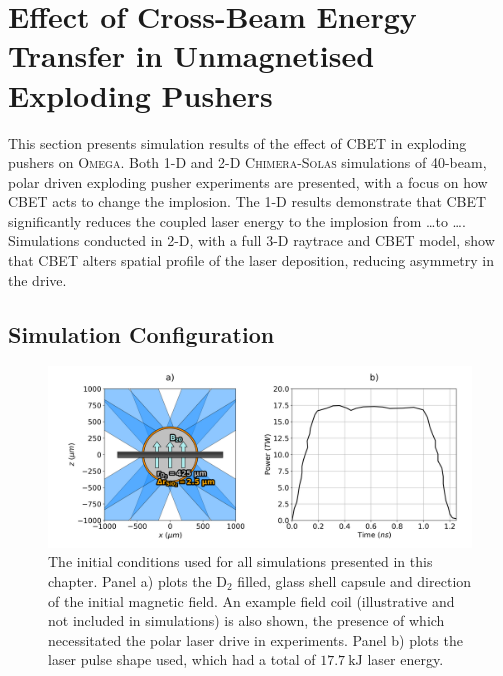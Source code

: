 \section{Effect of Cross-Beam Energy Transfer in Unmagnetised Exploding Pushers}%
\label{sec:Res2_CBET_expl}

This section presents simulation results of the effect of \ac{CBET} in exploding pushers on \textsc{Omega}.
Both 1-D and 2-D \textsc{Chimera}-\textsc{Solas} simulations of 40-beam, polar driven exploding pusher experiments are presented, with a focus on how \ac{CBET} acts to change the implosion.
The 1-D results demonstrate that \ac{CBET} significantly reduces the coupled laser energy to the implosion from \dots to \dots.
Simulations conducted in 2-D, with a full 3-D raytrace and \ac{CBET} model, show that \ac{CBET} alters spatial profile of the laser deposition, reducing asymmetry in the drive.



\subsection{Simulation Configuration}%
\label{sec:Res2_simconfig}


\begin{figure}[t!]
    \includegraphics[width=\linewidth]{Results2/Images/magpdd_diagram_pulse.png}
    \centering
    \caption{The initial conditions used for all simulations presented in this chapter.
    Panel a) plots the D${}_{2}$ filled, glass shell capsule and direction of the initial magnetic field.
    An example field coil (illustrative and not included in simulations) is also shown, the presence of which necessitated the polar laser drive in experiments.
    Panel b) plots the laser pulse shape used, which had a total of $17.7\ \text{kJ}$ laser energy.}%
    \label{fig:Res2_simconfig}
\end{figure}


